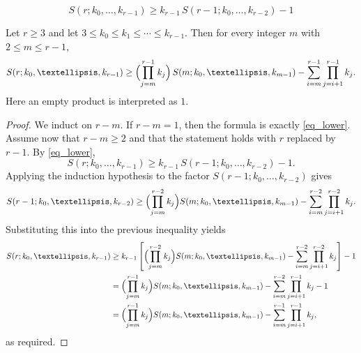 \documentclass[10pt,a4paper]{amsart}
\begin{document}
\begin{equation}\label{eq_lower}
S(r;k_0,\dots,k_{r-1})\ge k_{r-1}\,S(r-1;k_0,\dots,k_{r-2})-1
\end{equation}

\begin{theorem}\label{th:iterated-recursive-lower}
Let $r\ge 3$ and let $3\le k_0\le k_1\le \cdots \le k_{r-1}$.  Then for every integer $m$ with
$2\le m\le r-1$,
\[
S(r;k_0,\dots,k_{r-1})
\ge
\Bigl(\prod_{j=m}^{r-1}k_j\Bigr)\,S(m;k_0,\dots,k_{m-1})
-\sum_{i=m}^{r-1}\prod_{j=i+1}^{r-1}k_j.
\]
Here an empty product is interpreted as $1$.
\end{theorem}

\begin{proof}
We induct on $r-m$.  If $r-m=1$, then the formula is exactly \eqref{eq_lower}.
Assume now that $r-m\ge 2$ and that the statement holds with $r$ replaced by $r-1$.
By \eqref{eq_lower},
\[
S(r;k_0,\dots,k_{r-1})\ge k_{r-1}\,S(r-1;k_0,\dots,k_{r-2})-1.
\]
Applying the induction hypothesis to the factor $S(r-1;k_0,\dots,k_{r-2})$ gives
\[
S(r-1;k_0,\dots,k_{r-2})
\ge
\Bigl(\prod_{j=m}^{r-2}k_j\Bigr)S(m;k_0,\dots,k_{m-1})
-\sum_{i=m}^{r-2}\prod_{j=i+1}^{r-2}k_j.
\]
Substituting this into the previous inequality yields
\[
\begin{aligned}
S(r;k_0,\dots,k_{r-1})
&\ge k_{r-1}\left[
\Bigl(\prod_{j=m}^{r-2}k_j\Bigr)S(m;k_0,\dots,k_{m-1})
-\sum_{i=m}^{r-2}\prod_{j=i+1}^{r-2}k_j
\right]-1\\
&=
\Bigl(\prod_{j=m}^{r-1}k_j\Bigr)S(m;k_0,\dots,k_{m-1})
-\sum_{i=m}^{r-2}\prod_{j=i+1}^{r-1}k_j-1\\
&=
\Bigl(\prod_{j=m}^{r-1}k_j\Bigr)S(m;k_0,\dots,k_{m-1})
-\sum_{i=m}^{r-1}\prod_{j=i+1}^{r-1}k_j,
\end{aligned}
\]
as required.
\end{proof}
\end{document}
